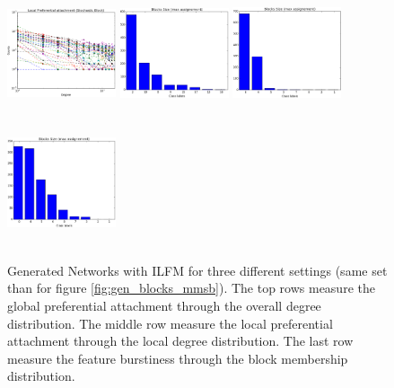 \begin{figure}[h]
	\includegraphics[width=3.2cm, height=3.7cm]{img/M_g_regular/figure_3}
	\endminipage
		\vspace{-0.4cm}
	\includegraphics[width=3.2cm, height=3.7cm]{img/M_g_peaks/figure_5}
	\endminipage
	\includegraphics[width=3.2cm, height=3.7cm]{img/M_g_power_law/figure_5} 
	\endminipage
	\includegraphics[width=3.2cm, height=3.7cm]{img/M_g_regular/figure_5}
	\endminipage
	\caption{Generated Networks with ILFM for three different settings (same set than for figure \ref{fig:gen_blocks_mmsb}). The top rows measure the global preferential attachment through the overall degree distribution. The middle row measure the local preferential attachment through the local degree distribution. The last row measure the feature burstiness through the block membership distribution.}
	\label{fig:gen_burst_mmsb}
\end{figure}


